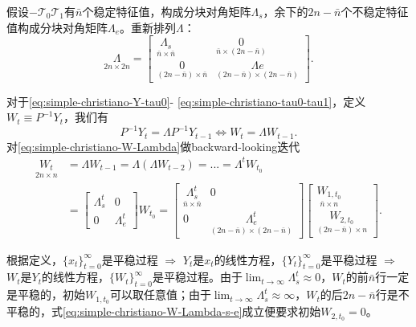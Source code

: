 假设$- \mathcal{T}_{0} \mathcal{T}_1$有$\bar{n}$个稳定特征值，构成分块对角矩阵$\Lambda_s$，余下的$2n - \bar{n}$个不稳定特征值构成分块对角矩阵$\Lambda_e$。重新排列$\Lambda$：
\begin{equation*}
  \underset{2n \times 2n}{\Lambda} = \begin{bmatrix}
  \underset{\bar{n} \times \bar{n}}{\Lambda_s} &
  \underset{\bar{n} \times (2n-\bar{n})}{0} \\
  \underset{(2n - \bar{n}) \times \bar{n}}{0} &
  \underset{(2n-\bar{n}) \times (2n-\bar{n})}{\Lambda{e}}
  \end{bmatrix}.
\end{equation*}

对于\eqref{eq:simple-christiano-Y-tau0}- \eqref{eq:simple-christiano-tau0-tau1}，定义$W_{t} \equiv P^{-1} Y_t$，我们有
\begin{equation}
  \label{eq:simple-christiano-W-Lambda}
  P^{-1} Y_t = \Lambda P^{-1} Y_{t-1} \Leftrightarrow W_{t} = \Lambda W_{t-1}.
\end{equation}
对\eqref{eq:simple-christiano-W-Lambda}做backward-looking迭代
\begin{equation}
\label{eq:simple-christiano-W-Lambda-s-e}
\begin{split}
    \underset{2n \times n}{W_t} &= \Lambda W_{t-1} = \Lambda (\Lambda W_{t-2}) = ... = \Lambda^t W_{t_0} \\
    &= \begin{bmatrix}
    \Lambda_s^t & 0\\
    0 & \Lambda_e^t
    \end{bmatrix} W_{t_0} = \begin{bmatrix}
    \underset{\bar{n} \times \bar{n}}{\Lambda_s^t} & 0\\
    0 & \underset{(2n-\bar{n}) \times (2n-\bar{n})}{\Lambda_e^t}
    \end{bmatrix} \begin{bmatrix}
    \underset{\bar{n} \times n}{W_{1,t_0}} \\
    \underset{(2n-\bar{n}) \times n}{W_{2, t_0}}
    \end{bmatrix}.
\end{split}
\end{equation}

根据定义，$\{{x_t}\}_{t=0}^{\infty}$是平稳过程 $\Rightarrow$ $Y_t$是$x_t$的线性方程，$\{{Y_t}\}_{t=0}^{\infty}$是平稳过程 $\Rightarrow$ $W_t$是$Y_t$的线性方程，$\{{W_t}\}_{t=0}^{\infty}$是平稳过程。由于$\lim_{t \rightarrow \infty} \Lambda_s^t \approx 0$，$W_t$的前$\bar{n}$行一定是平稳的，初始$W_{1,t_0}$可以取任意值；由于$\lim_{t \rightarrow \infty} \Lambda_s^t \approx \infty$，$W_t$的后$2n - \bar{n}$行是不平稳的，式\eqref{eq:simple-christiano-W-Lambda-s-e}成立便要求初始$W_{2,t_0} = 0$。

